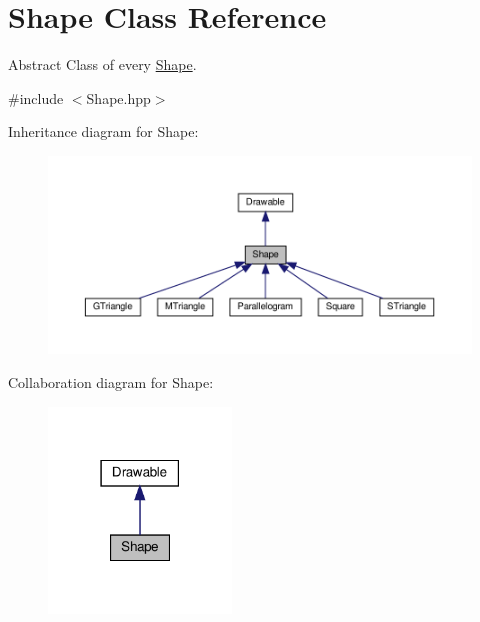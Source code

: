 \hypertarget{classShape}{}\section{Shape Class Reference}
\label{classShape}


Abstract Class of every \hyperlink{classShape}{Shape}.  




{\ttfamily \#include $<$Shape.\+hpp$>$}



Inheritance diagram for Shape\+:\nopagebreak
\begin{figure}[H]
\begin{center}
\leavevmode
\includegraphics[width=350pt]{classShape__inherit__graph}
\end{center}
\end{figure}


Collaboration diagram for Shape\+:\nopagebreak
\begin{figure}[H]
\begin{center}
\leavevmode
\includegraphics[width=138pt]{classShape__coll__graph}
\end{center}
\end{figure}
